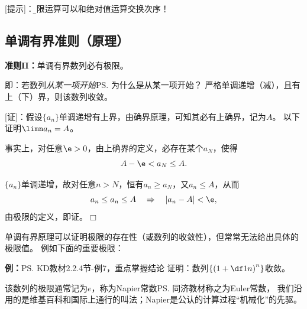 [提示]：{\b 极限运算可以和绝对值运算交换次序！}

\subsection{单调有界准则（原理）}

\begin{thx}
{\bf 准则II：}单调有界数列必有极限。
\end{thx}

即：若数列{\it 从某一项开始}\ps{为什么是从某一项开始？}
严格单调递增（减），且有上（下）界，则该数列收敛。

[证]：假设$\{a_n\}$单调递增有上界，由确界原理，可知其必有上确界，记为$A$。
以下证明$\limn a_n=A$。

事实上，对任意$\e>0$，由上确界的定义，必存在某个$a_N$，使得
$$A-\e<a_N\leq A.$$

$\{a_n\}$单调递增，故对任意$n>N$，恒有$a_n\geq a_N$，又$a_n\leq A$，从而
$$a_n\leq a_n\leq A\quad\Rightarrow\quad |a_n-A|<\e,$$
由极限的定义，即证。\hfill $\Box$

单调有界原理可以证明极限的存在性（或数列的收敛性），但常常无法给出具体的极限值。
例如下面的重要极限：

{\bf 例：}\ps{KD教材2.2.4节-例7，重点掌握结论}
证明：数列$\left\{\left(1+\df1n\right)^n\right\}$收敛。

该数列的极限通常记为$e$，称为{\kaishu Napier常数}\ps{同济教材称之为Euler常数，
我们沿用的是维基百科和国际上通行的叫法；Napier是公认的计算过程“机械化”的先驱}。

